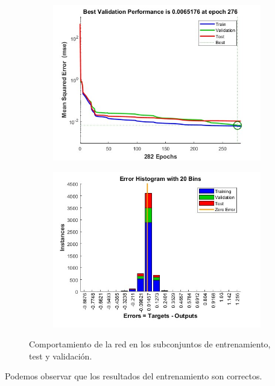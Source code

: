 \documentclass[a4paper, 12pt]{article}
\begin{document}
		\begin{figure}[htp!]
			\begin{subfigure}{0.5\textwidth}
				\centering
				\includegraphics[width=\textwidth]{figures/parte2/ejerF1.jpg}
			\end{subfigure}
			\begin{subfigure}{0.5\textwidth}
				\includegraphics[width=\textwidth]{figures/parte2/ejerF.jpg}
			\end{subfigure}
			\caption{Comportamiento de la red en los subconjuntos de entrenamiento, test y validación.}
		\end{figure}
		Podemos observar que los resultados del entrenamiento son correctos.
		
\end{document}
